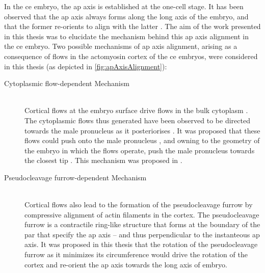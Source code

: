 In the \ac{ce} embryo, the \ac{ap} axis is established at the one-cell stage. It has been observed that the \ac{ap} axis always forms along the long axis of the embryo, and that the former re-orients to align with the latter \citep{goldstein1996specification}. The aim of the work presented in this thesis was to elucidate the mechanism behind this \ac{ap} axis alignment in the \ac{ce} embryo. Two possible mechanisms of \ac{ap} axis alignment, arising as a consequence of flows in the actomyosin cortex of the \ac{ce} embryos, were considered in this thesis (as depicted in \autoref{fig:apAxisAlignment}):
\begin{description}
    \item[Cytoplasmic flow-dependent Mechanism]\hfill\\
    Cortical flows at the embryo surface drive flows in the bulk cytoplasm \citep{niwayama2011hydrodynamic}. The cytoplasmic flows thus generated have been observed to be directed towards the male pronucleus as it posteriorises \citep{goldstein1996specification}. It was proposed that these flows could push onto the male pronucleus \citep{kimuraCytoplasmicFlows}, and owning to the geometry of the embryo in which the flows operate, push the male pronucleus towards the closest tip \citep{goldstein1996specification}. This mechanism was proposed in \citep{goldstein1996specification}.
    \item[Pseudocleavage furrow-dependent Mechanism]\hfill\\
    Cortical flows also lead to the formation of the pseudocleavage furrow by compressive alignment of actin filaments in the cortex. The pseudocleavage furrow is a contractile ring-like structure that forms at the boundary of the \ac{par} that specify the \ac{ap} axis -- and thus perpendicular to the instanteous \ac{ap} axis. It was proposed in this thesis that the rotation of the pseudocleavage furrow as it minimizes its circumference would drive the rotation of the cortex and re-orient the \ac{ap} axis towards the long axis of embryo. 
\end{description}

